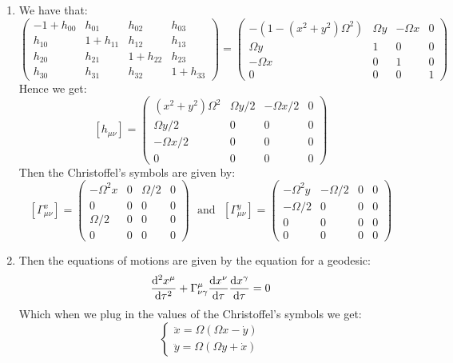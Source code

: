 \documentclass[10pt,a4paper]{article}
\begin{document}
\begin{enumerate}
\item We have that:
\[
\begin{pmatrix}
-1 + h_{00} & h_{01} & h_{02} & h_{03}\\
h_{10} & 1 + h_{11} & h_{12} & h_{13}\\
h_{2 0} & h_{21} & 1 + h_{22} & h_{23}\\
h_{30} & h_{31} & h_{32} & 1 + h_{33}
\end{pmatrix}
= 
\begin{pmatrix}
-(1 - (x^2 + y^2) \Omega^2) & \Omega y & -\Omega x & 0\\
\Omega y & 1 & 0 & 0\\
-\Omega x & 0 & 1 & 0\\
0 & 0 & 0 & 1
\end{pmatrix}
\]
Hence we get:
\[
[h_{\mu \nu}] = \begin{pmatrix}
(x^2 + y^2) \Omega^2 & \Omega y/2 & - \Omega x/2 & 0\\
\Omega y/2 & 0 & 0 & 0\\
-\Omega x/2 & 0 & 0 & 0\\
0 & 0 & 0 & 0
\end{pmatrix}
\]
Then the Christoffel's symbols are given by:
\[
[\Gamma^x_{\mu \nu}] = \begin{pmatrix}
- \Omega^2 x & 0 & \Omega/2 & 0\\
0 & 0 & 0 & 0\\
\Omega/2 & 0 & 0 & 0\\
0 & 0 & 0 & 0
\end{pmatrix} \mbox{~~and~~} [\Gamma^y_{\mu \nu}] = \begin{pmatrix}
- \Omega^2 y & - \Omega/2 & 0 & 0\\
- \Omega/2 & 0 & 0 & 0\\
0& 0 & 0 & 0\\
0 & 0 & 0 & 0
\end{pmatrix}
\]

\item Then the equations of motions are given by the equation for a geodesic:
\[
\dv[2]{x^\mu}{\tau} + \Gamma^\mu_{\nu \gamma} \dv{x^\nu}{\tau} \dv{x^\gamma}{\tau} = 0
\]
Which when we plug in the values of the Christoffel's symbols we get:
\[
\begin{cases}
\ddot{x} = \Omega (\Omega x -  \dot{y})\\
\ddot{y} = \Omega(\Omega y +  \dot{x})
\end{cases}
\]

\end{enumerate}
\end{document}
